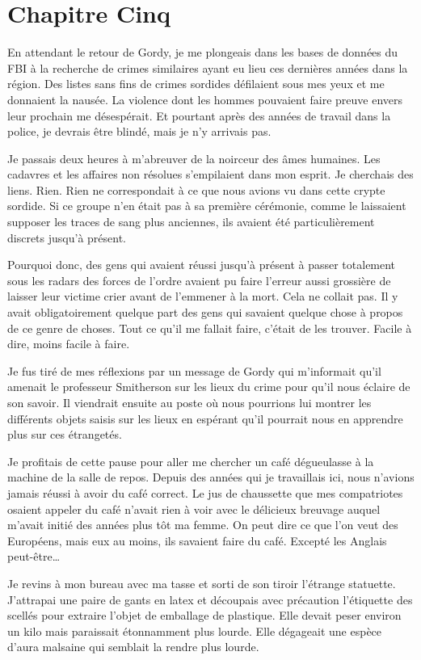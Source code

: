 \chapter[Chapitre Cinq]{Chapitre Cinq}
En attendant le retour de Gordy, je me plongeais dans les bases de données du FBI à la recherche de crimes similaires
ayant eu lieu ces dernières années dans la région. Des listes sans fins de crimes sordides défilaient sous mes yeux et
me donnaient la nausée. La violence dont les hommes pouvaient faire preuve envers leur prochain me désespérait. Et 
pourtant après des années de travail dans la police, je devrais être blindé, mais je n'y arrivais pas.

Je passais deux heures à m'abreuver de la noirceur des âmes humaines. Les cadavres et les affaires non résolues
s'empilaient dans mon esprit. Je cherchais des liens. Rien. Rien ne correspondait à ce que nous avions vu dans cette
crypte sordide. Si ce groupe n'en était pas à sa première cérémonie, comme le laissaient supposer les traces de sang
plus anciennes, ils avaient été particulièrement discrets jusqu'à présent.

Pourquoi donc, des gens qui avaient réussi jusqu'à présent à passer totalement sous les radars des forces de l'ordre
avaient pu faire l'erreur aussi grossière de laisser leur victime crier avant de l'emmener à la mort. Cela ne collait
pas. Il y avait obligatoirement quelque part des gens qui savaient quelque chose à propos de ce genre de choses. Tout 
ce qu'il me fallait faire, c'était de les trouver. Facile à dire, moins facile à faire.

Je fus tiré de mes réflexions par un message de Gordy qui m'informait qu'il amenait le professeur Smitherson sur les
lieux du crime pour qu'il nous éclaire de son savoir. Il viendrait ensuite au poste où nous pourrions lui montrer
les différents objets saisis sur les lieux en espérant qu'il pourrait nous en apprendre plus sur ces étrangetés.

Je profitais de cette pause pour aller me chercher un café dégueulasse à la machine de la salle de repos. Depuis des
années qui je travaillais ici, nous n'avions jamais réussi à avoir du café correct. Le jus de chaussette que mes
compatriotes osaient appeler du café n'avait rien à voir avec le délicieux breuvage auquel m'avait initié des années
plus tôt ma femme. On peut dire ce que l'on veut des Européens, mais eux au moins, ils savaient faire du café. Excepté
les Anglais peut-être\ldots{}

Je revins à mon bureau avec ma tasse et sorti de son tiroir l'étrange statuette. J'attrapai une paire de gants en latex
et découpais avec précaution l'étiquette des scellés pour extraire l'objet de emballage de plastique. Elle devait peser
environ un kilo mais paraissait étonnamment plus lourde. Elle dégageait une espèce d'aura malsaine qui semblait la
rendre plus lourde.

